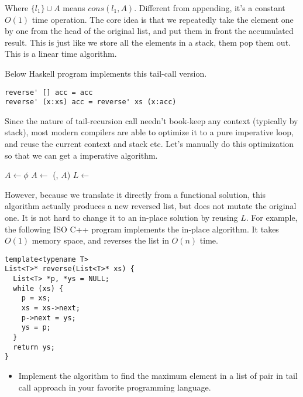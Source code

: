 \documentclass[UTF8]{article}
\begin{document}
Where $\{l_1\} \cup A$ means $cons(l_1, A)$. Different from appending, it's a constant $O(1)$ time operation. The core idea is
that we repeatedly take the element one by one from the head of the original list, and put them in front the accumulated
result. This is just like we store all the elements in a stack, them pop them out. This is a linear time algorithm.

Below Haskell program implements this tail-call version.

\begin{lstlisting}
reverse' [] acc = acc
reverse' (x:xs) acc = reverse' xs (x:acc)
\end{lstlisting}

Since the nature of tail-recursion call needn't book-keep any context (typically by stack), most modern compilers are
able to optimize it to a pure imperative loop, and reuse the current context and stack etc. Let's manually do this
optimization so that we can get a imperative algorithm.

\begin{algorithmic}[1]
  \State $A \gets \phi$
    \State $A \gets $ (, $A$)
    \State $L \gets$ 
  \EndWhile
\EndFunction
\end{algorithmic}

However, because we translate it directly from a functional solution, this algorithm actually produces a new reversed list,
but does not mutate the original one. It is not hard to change it to an in-place solution by reusing $L$. For example, the following
ISO C++ program implements the in-place algorithm. It takes $O(1)$ memory space, and reverses the list in $O(n)$ time.

\lstset{language=C++}
\begin{lstlisting}
template<typename T>
List<T>* reverse(List<T>* xs) {
  List<T> *p, *ys = NULL;
  while (xs) {
    p = xs;
    xs = xs->next;
    p->next = ys;
    ys = p;
  }
  return ys;
}
\end{lstlisting}

\begin{Exercise}
\begin{itemize}
\item Implement the algorithm to find the maximum element in a list of pair in tail call approach in your favorite programming
language.
\end{itemize}
\end{Exercise}
\end{document}
